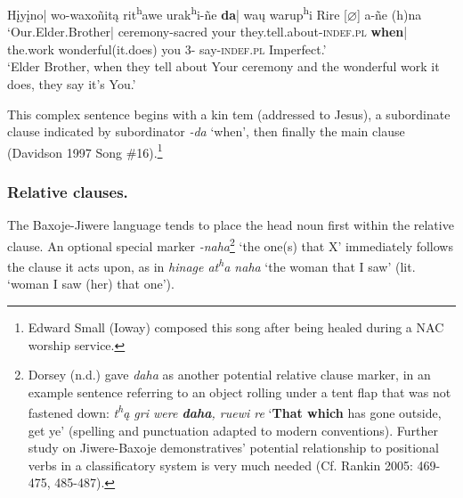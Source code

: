 \documentclass[output=paper]{LSP/langsci}
\begin{document}
\ea \gll  H\k{i}y\k{i}no| wo-waxo\~nit\k{a}   rit\textsuperscript{h}awe  urak\textsuperscript{h}i-\~ne   \textbf{da}| wa\k{u}       warup\textsuperscript{h}i  Rire  [$\varnothing$] a-\~ne  (h)na \\ 
`Our.Elder.Brother| 	ceremony-sacred  your  they.tell.about-\textsc{indef.pl}   \textbf{when}| the.work wonderful(it.does)	  you  3- say-\textsc{indef.pl}         Imperfect.' \\
\trans `Elder Brother, when they tell about Your ceremony and the wonderful work it does, they say it's You.'
\z		

This complex sentence begins with a kin tem (addressed to Jesus), a subordinate clause indicated by subordinator \textit{-da} `when', then finally the main clause (Davidson 1997 Song \#16).\footnote{Edward Small (Ioway) composed this song after being healed during a NAC worship service.}  		

\subsubsection{Relative clauses.}  
The Baxoje-Jiwere language tends to place the head noun first within the relative clause.  An optional special marker \textit{-naha}\footnote{Dorsey (n.d.) gave \textit{daha} as another potential relative clause marker, in an example sentence referring to an object rolling under a tent flap that was not fastened down: \textit{t\textsuperscript{h}\k{a} gri were \textbf{daha}, ruewi re} `\textbf{That which} has gone outside, get ye' (spelling and punctuation adapted to modern conventions). Further study on Jiwere-Baxoje demonstratives' potential relationship to positional verbs in a classificatory system is very much needed (Cf. Rankin 2005: 469-475, 485-487).}  `the one(s) that X' immediately follows the clause it acts upon, as in \textit{hinage at\textsuperscript{h}a naha} `the woman that I saw' (lit. `woman I saw (her) that one').   
\end{document}
